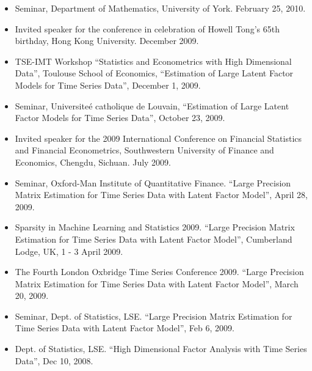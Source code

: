 \documentclass[overlapped,line,letterpaper]{res}
\begin{document}
\begin{resume}
\begin{itemize}
\item[$\bullet$] Seminar, Department of Mathematics, University of
York. February 25, 2010.\\

\item[$\bullet$] Invited speaker for the conference in celebration of Howell Tong's 65th birthday, Hong Kong University. December 2009.\\

\item[$\bullet$] TSE-IMT Workshop ``Statistics and Econometrics with High Dimensional
Data'',  Toulouse School of Economics, ``Estimation of Large Latent
Factor Models for Time Series Data'', December 1, 2009.\\

\item[$\bullet$] Seminar, Universite\'{e} catholique de Louvain, ``Estimation of Large Latent Factor Models for Time Series Data'',
October 23, 2009.\\

\item[$\bullet$] Invited speaker for the 2009 International Conference on Financial Statistics and Financial Econometrics, Southwestern University of Finance and Economics, Chengdu, Sichuan. July 2009.\\

\item[$\bullet$] Seminar, Oxford-Man Institute of Quantitative
Finance. ``Large Precision Matrix Estimation for Time Series Data
with Latent Factor Model'', April 28, 2009.\\

\item[$\bullet$] Sparsity in Machine Learning and Statistics 2009.
``Large Precision Matrix Estimation for Time Series Data with Latent
Factor Model'', Cumberland Lodge, UK, 1 - 3 April 2009.\\

\item[$\bullet$] The Fourth London Oxbridge Time Series Conference
2009. ``Large Precision Matrix Estimation for Time Series Data with
Latent Factor Model'', March 20, 2009.\\

\item[$\bullet$] Seminar, Dept. of Statistics, LSE. ``Large Precision Matrix Estimation for Time Series Data with Latent Factor
Model'', Feb 6, 2009.\\

\item[$\bullet$] Dept. of Statistics, LSE. ``High Dimensional Factor Analysis with Time Series Data'', Dec 10, 2008.\\


\end{itemize}
\end{resume}
\end{document}
